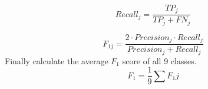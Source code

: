\documentclass[%
 reprint,
 amsmath,amssymb,
 aps,
]{revtex4-2}
\begin{document}
\begin{equation}
Recall_j = \frac{TP_j}{TP_j + FN_j}
\end{equation}

\begin{equation}
F_{1j} = \frac{2 \cdot Precision_j \cdot Recall_j}{Precision_j + Recall_j}
\end{equation}
Finally calculate the average $F_1$ score of all 9 classes.
\begin{equation}
F_1 = \frac{1}{9} \sum F_1j
\end{equation}
\cite{tsinghua}


\end{document}
